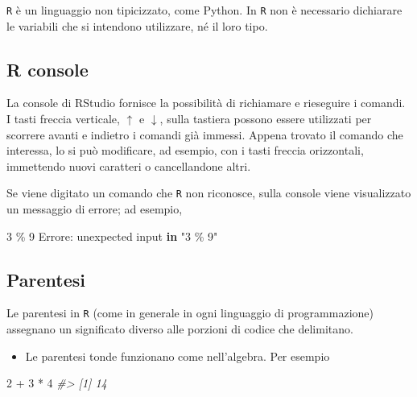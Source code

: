 \documentclass[
  11pt,
]{krantz}
\makeatletter
\newenvironment{Shaded}{\begin{snugshade}}{\end{snugshade}}
\newcommand{\CommentTok}[1]{\textcolor[rgb]{0.37,0.37,0.37}{\textit{#1}}}
\newcommand{\ControlFlowTok}[1]{\textcolor[rgb]{0.27,0.27,0.27}{\textbf{#1}}}
\newcommand{\DecValTok}[1]{\textcolor[rgb]{0.06,0.06,0.06}{#1}}
\newcommand{\NormalTok}[1]{#1}
\newcommand{\SpecialCharTok}[1]{\textcolor[rgb]{0,0,0}{#1}}
\newcommand{\StringTok}[1]{\textcolor[rgb]{0.5,0.5,0.5}{#1}}
\providecommand{\tightlist}{%
  \setlength{\itemsep}{0pt}\setlength{\parskip}{0pt}}
\newenvironment{kframe}{%
\medskip{}
\setlength{\fboxsep}{.8em}
 \def\at@end@of@kframe{}%
 \ifinner\ifhmode%
  \def\at@end@of@kframe{\end{minipage}}%
  \begin{minipage}{\columnwidth}%
 \fi\fi%
 \def\FrameCommand##1{\hskip\@totalleftmargin \hskip-\fboxsep
 \colorbox{shadecolor}{##1}\hskip-\fboxsep
     \hskip-\linewidth \hskip-\@totalleftmargin \hskip\columnwidth}%
 \MakeFramed {\advance\hsize-\width
   \@totalleftmargin\z@ \linewidth\hsize
   \@setminipage}}%
 {\par\unskip\endMakeFramed%
 \at@end@of@kframe}
\renewenvironment{Shaded}{\begin{kframe}}{\end{kframe}}
\theoremstyle{definition}
\theoremstyle{definition}
\theoremstyle{definition}
\theoremstyle{definition}
\theoremstyle{remark}
\makeatother
\begin{document}
\texttt{R} è un linguaggio non tipicizzato, come Python. In \texttt{R} non è necessario dichiarare le variabili che si intendono utilizzare, né il loro tipo.

\hypertarget{r-console}{%
\subsection{R console}\label{r-console}}

La console di RStudio fornisce la possibilità di richiamare e rieseguire i comandi. I tasti freccia verticale, \(\uparrow\) e \(\downarrow\), sulla tastiera possono essere utilizzati per scorrere avanti e indietro i comandi già immessi. Appena trovato il comando che interessa, lo si può modificare, ad esempio, con i tasti freccia orizzontali, immettendo nuovi caratteri o cancellandone altri.

Se viene digitato un comando che \texttt{R} non riconosce, sulla console viene visualizzato un messaggio di errore; ad esempio,

\begin{Shaded}
\begin{Highlighting}[]
\DecValTok{3}\NormalTok{ \% }\DecValTok{9}
\NormalTok{Errore}\SpecialCharTok{:}\NormalTok{ unexpected input }\ControlFlowTok{in} \StringTok{"3 \% 9"}
\end{Highlighting}
\end{Shaded}

\hypertarget{parentesi}{%
\subsection{Parentesi}\label{parentesi}}

Le parentesi in \texttt{R} (come in generale in ogni linguaggio di programmazione) assegnano un significato diverso alle porzioni di codice che delimitano.

\begin{itemize}
\tightlist
\item
  Le parentesi tonde funzionano come nell'algebra. Per esempio
\end{itemize}

\begin{Shaded}
\begin{Highlighting}[]
\DecValTok{2} \SpecialCharTok{+} \DecValTok{3} \SpecialCharTok{*} \DecValTok{4}
\CommentTok{\#\textgreater{} [1] 14}
\end{Highlighting}
\end{Shaded}
\end{document}
